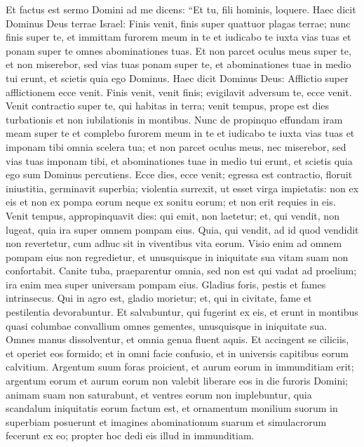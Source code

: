 \begin{biblechapter}  
\verse Et factus est sermo Domini ad me dicens: 
\verse “Et tu, fili hominis, loquere. Haec dicit Dominus Deus terrae Israel: Finis venit, finis super quattuor plagas terrae; 
\verse nunc finis super te, et immittam furorem meum in te et iudicabo te iuxta vias tuas et ponam super te omnes abominationes tuas.  
\verse Et non parcet oculus meus super te, et non miserebor, sed vias tuas ponam super te, et abominationes tuae in medio tui erunt, et scietis quia ego Dominus. 
\verse Haec dicit Dominus Deus: Afflictio super afflictionem ecce venit. 
\verse Finis venit, venit finis; evigilavit adversum te, ecce venit. 
\verse Venit contractio super te, qui habitas in terra; venit tempus, prope est dies turbationis et non iubilationis in montibus. 
\verse Nunc de propinquo effundam iram meam super te et complebo furorem meum in te et iudicabo te iuxta vias tuas et imponam tibi omnia scelera tua; 
\verse et non parcet oculus meus, nec miserebor, sed vias tuas imponam tibi, et abominationes tuae in medio tui erunt, et scietis quia ego sum Dominus percutiens. 
\verse Ecce dies, ecce venit; egressa est contractio, floruit iniustitia, germinavit superbia; 
\verse violentia surrexit, ut esset virga impietatis: non ex eis et non ex pompa eorum neque ex sonitu eorum; et non erit requies in eis. 
\verse Venit tempus, appropinquavit dies: qui emit, non laetetur; et, qui vendit, non lugeat, quia ira super omnem pompam eius. 
\verse Quia, qui vendit, ad id quod vendidit non revertetur, cum adhuc sit in viventibus vita eorum. Visio enim ad omnem pompam eius non regredietur, et unusquisque in iniquitate sua vitam suam non confortabit. 
\verse Canite tuba, praeparentur omnia, sed non est qui vadat ad proelium; ira enim mea super universam pompam eius. 
\verse Gladius foris, pestis et fames intrinsecus. Qui in agro est, gladio morietur; et, qui in civitate, fame et pestilentia devorabuntur. 
\verse Et salvabuntur, qui fugerint ex eis, et erunt in montibus quasi columbae convallium omnes gementes, unusquisque in iniquitate sua. 
\verse Omnes manus dissolventur, et omnia genua fluent aquis. 
\verse Et accingent se ciliciis, et operiet eos formido; et in omni facie confusio, et in universis capitibus eorum calvitium. 
\verse Argentum suum foras proicient, et aurum eorum in immunditiam erit; argentum eorum et aurum eorum non valebit liberare eos in die furoris Domini; animam suam non saturabunt, et ventres eorum non implebuntur, quia scandalum iniquitatis eorum factum est, 
\verse et ornamentum monilium suorum in superbiam posuerunt et imagines abominationum suarum et simulacrorum fecerunt ex eo; propter hoc dedi eis illud in immunditiam. 

\end{biblechapter}
